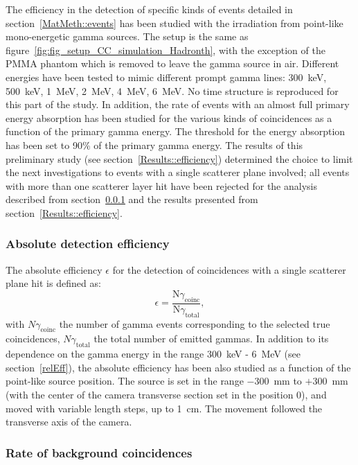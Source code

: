 The efficiency in the detection of specific kinds of events detailed in section~\ref{MatMeth::events} has been studied with the irradiation from point-like mono-energetic gamma sources. The setup is the same as figure~\ref{fig:fig_setup_CC_simulation_Hadronth}, with the exception of the PMMA phantom which is removed to leave the gamma source in air. Different energies have been tested to mimic different prompt gamma lines: 300~keV, 500~keV, 1~MeV, 2~MeV, 4~MeV, 6~MeV. No time structure is reproduced for this part of the study.
In addition, the rate of events with an almost full primary energy absorption has been studied for the various kinds of coincidences as a function of the primary gamma energy. The threshold for the energy absorption has been set to 90\% of the primary gamma energy. 
The results of this preliminary study (see section~\ref{Results::efficiency}) determined the choice to limit the next investigations to events with a single scatterer plane involved; all events with more than one scatterer layer hit have been rejected for the analysis described from section~\ref{absEff} and the results presented from section~\ref{Results::efficiency}.

\subsubsection{Absolute detection efficiency}\label{absEff}

The absolute efficiency $\epsilon$ for the detection of coincidences with a single scatterer plane hit is defined as:
\begin{equation}
\epsilon =\frac{\mathrm{N}\gamma_{\mathrm{coinc}}}{\mathrm{N}\gamma_{\mathrm{total}}},
\end{equation}
\label{eq:equation_efficacite_absolue}
with $N\gamma_{\mathrm{coinc}}$ the number of gamma events corresponding to the selected true coincidences, $N\gamma_{\mathrm{total}}$ the total number of emitted gammas.
In addition to its dependence on the gamma energy in the range 300~keV - 6~MeV (see section~\ref{relEff}), the absolute efficiency has been also studied as a function of the point-like source position. The source is set in the range $-300$~mm to $+300$~mm (with the center of the camera transverse section set in the position 0), and moved with variable length steps, up to 1~cm. The movement followed the transverse axis of the camera. 

\subsubsection{Rate of background coincidences}

